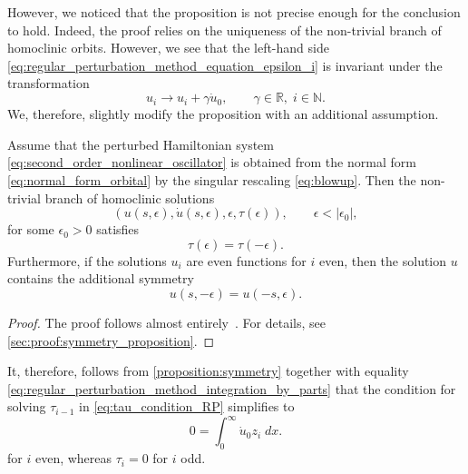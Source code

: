 However, we noticed that the proposition is not precise enough for the
conclusion to hold. Indeed, the proof relies on the uniqueness of the
non-trivial branch of homoclinic orbits. However, we see that the left-hand
side \cref{eq:regular_perturbation_method_equation_epsilon_i} is invariant
under the transformation
\[
u_i \to u_i + \gamma \dot u_0, \qquad \gamma \in\mathbb R, \; i\in\mathbb N.
\]
We, therefore, slightly modify the proposition with an additional assumption.

\begin{proposition}
    \label{proposition:symmetry}
    Assume that the perturbed Hamiltonian system
    \cref{eq:second_order_nonlinear_oscillator} is obtained from the normal form
    \cref{eq:normal_form_orbital} by the singular rescaling
    \cref{eq:blowup}. Then the non-trivial branch of homoclinic solutions 
    \[
        (u(s,\epsilon), \dot u(s, \epsilon), \epsilon, \tau(\epsilon)),
            \qquad \epsilon<|\epsilon_0|,
    \]
    for some $\epsilon_0>0$ satisfies
    \begin{equation}
        \label{eq:tau}
        \tau(\epsilon) = \tau(-\epsilon).
    \end{equation}
    Furthermore, if the solutions $u_i$ are even functions for $i$ even, then 
    the solution $u$ contains the additional symmetry
    \[
        u(s,-\epsilon) = u(-s,\epsilon)
    .\] 
\end{proposition}
\begin{proof}
    The proof follows almost entirely~\cite[Proposition 4.2]{Beyn_1994}. For
    details, see \cref{sec:proof:symmetry_proposition}.
\end{proof}

It, therefore, follows from \cref{proposition:symmetry} together with equality
\cref{eq:regular_perturbation_method_integration_by_parts} that the condition for
solving $\tau_{i-1}$ in \cref{eq:tau_condition_RP} simplifies to
\begin{equation}
    \label{eq:tau_condition_RP}
    0 = \int_0^\infty \dot u_0 z_i \; dx.
\end{equation}
for $i$ even, whereas $\tau_i=0$ for $i$ odd.

